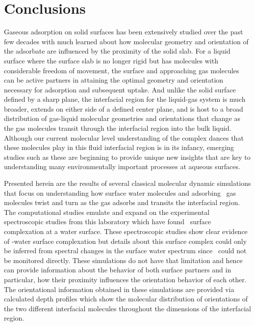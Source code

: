 \section {Conclusions}

Gaseous adsorption on solid surfaces has been extensively studied over the past few decades with much learned about how molecular geometry and orientation of the adsorbate are influenced by the proximity of the solid slab.  For a liquid surface where the surface slab is no longer rigid but has molecules with considerable freedom of movement, the surface and approaching gas molecules can be active partners in attaining the optimal geometry and orientation necessary for adsorption and subsequent uptake.    And unlike the solid surface defined by a sharp plane, the interfacial region for the liquid-gas system is much broader, extends on either side of a defined center plane, and is host to a broad distribution of gas-liquid molecular geometries and orientations that change as the gas molecules transit through the interfacial region into the bulk liquid.  Although  our current molecular level understanding of  the complex dances that these molecules play in this fluid interfacial region is in its infancy, emerging studies such as these are beginning to provide unique new insights that are key to understanding many  environmentally important processes at aqueous surfaces.

Presented herein are the results of several classical molecular dynamic simulations that focus on understanding how surface water molecules and adsorbing \suldiox~gas molecules twist and turn as the gas adsorbs and transits the interfacial region. The computational studies emulate and expand on the experimental spectroscopic studies from this laboratory which have found \suldiox~surface complexation at a water surface.\cite{Tarbuck2005,Tarbuck2006,Ota2011}  These spectroscopic studies show clear evidence of \suldiox-water surface complexation but details about this surface complex could only be inferred from spectral changes in the surface water spectrum since \suldiox~could not be monitored directly.   These simulations do not have that limitation and hence can provide information about the behavior of both surface partners and in particular, how their proximity influences the orientation behavior of each other.  The orientational information obtained in these simulations are provided via calculated depth profiles which show the molecular distribution of orientations of the two different interfacial molecules throughout the dimensions of the interfacial region.

